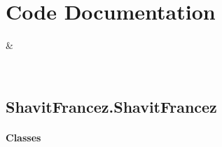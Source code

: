 \documentclass[letterpaper,10pt,english]{sphinxmanual}
\begin{document}
\sphinxstepscope


\chapter{Code Documentation}
\label{\detokenize{docs/ShavitFrancez/code:code-documentation}}\label{\detokenize{docs/ShavitFrancez/code::doc}}

\begin{savenotes}\sphinxattablestart
\sphinxthistablewithglobalstyle
\sphinxthistablewithnovlinesstyle
\centering
\begin{tabulary}{\linewidth}[t]{}
\sphinxtoprule
\sphinxtableatstartofbodyhook
\sphinxAtStartPar
{\hyperref[\detokenize{docs/ShavitFrancez/generated/ShavitFrancez.ShavitFrancez:module-ShavitFrancez.ShavitFrancez}]{}}
&
\sphinxAtStartPar

\\
\sphinxbottomrule
\end{tabulary}
\sphinxtableafterendhook\par
\sphinxattableend\end{savenotes}

\sphinxstepscope


\section{ShavitFrancez.ShavitFrancez}
\label{\detokenize{docs/ShavitFrancez/generated/ShavitFrancez.ShavitFrancez:module-ShavitFrancez.ShavitFrancez}}\label{\detokenize{docs/ShavitFrancez/generated/ShavitFrancez.ShavitFrancez:shavitfrancez-shavitfrancez}}\label{\detokenize{docs/ShavitFrancez/generated/ShavitFrancez.ShavitFrancez::doc}}\subsubsection*{Classes}


\begin{savenotes}\sphinxattablestart
\sphinxthistablewithglobalstyle
\sphinxthistablewithnovlinesstyle
\centering
\begin{tabulary}{\linewidth}[t]{}
\sphinxtoprule
\sphinxtableatstartofbodyhook\sphinxbottomrule
\end{tabulary}
\sphinxtableafterendhook\par
\sphinxattableend\end{savenotes}
\end{document}
